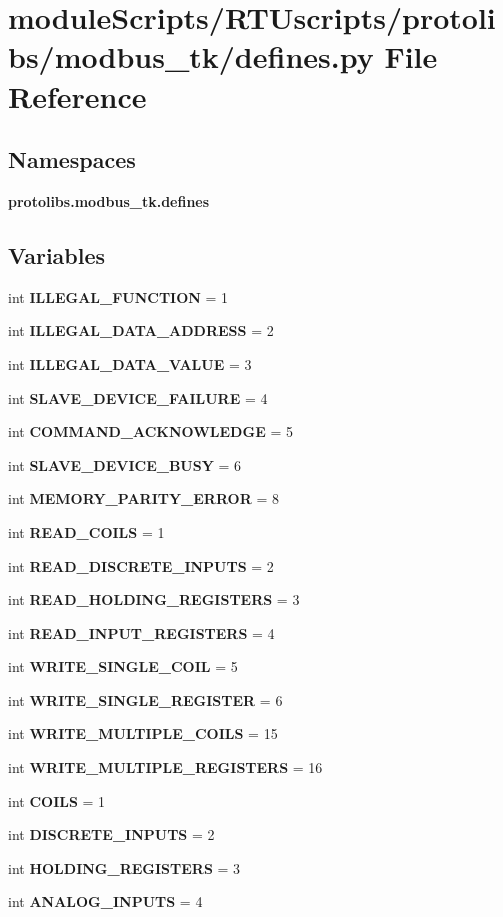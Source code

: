 \section{module\+Scripts/\+R\+T\+Uscripts/protolibs/modbus\+\_\+tk/defines.py File Reference}
\label{modbus__tk_2defines_8py}
\subsection*{Namespaces}
\begin{DoxyCompactItemize}
\item 
 {\bf protolibs.\+modbus\+\_\+tk.\+defines}
\end{DoxyCompactItemize}
\subsection*{Variables}
\begin{DoxyCompactItemize}
\item 
int {\bf I\+L\+L\+E\+G\+A\+L\+\_\+\+F\+U\+N\+C\+T\+I\+O\+N} = 1
\item 
int {\bf I\+L\+L\+E\+G\+A\+L\+\_\+\+D\+A\+T\+A\+\_\+\+A\+D\+D\+R\+E\+S\+S} = 2
\item 
int {\bf I\+L\+L\+E\+G\+A\+L\+\_\+\+D\+A\+T\+A\+\_\+\+V\+A\+L\+U\+E} = 3
\item 
int {\bf S\+L\+A\+V\+E\+\_\+\+D\+E\+V\+I\+C\+E\+\_\+\+F\+A\+I\+L\+U\+R\+E} = 4
\item 
int {\bf C\+O\+M\+M\+A\+N\+D\+\_\+\+A\+C\+K\+N\+O\+W\+L\+E\+D\+G\+E} = 5
\item 
int {\bf S\+L\+A\+V\+E\+\_\+\+D\+E\+V\+I\+C\+E\+\_\+\+B\+U\+S\+Y} = 6
\item 
int {\bf M\+E\+M\+O\+R\+Y\+\_\+\+P\+A\+R\+I\+T\+Y\+\_\+\+E\+R\+R\+O\+R} = 8
\item 
int {\bf R\+E\+A\+D\+\_\+\+C\+O\+I\+L\+S} = 1
\item 
int {\bf R\+E\+A\+D\+\_\+\+D\+I\+S\+C\+R\+E\+T\+E\+\_\+\+I\+N\+P\+U\+T\+S} = 2
\item 
int {\bf R\+E\+A\+D\+\_\+\+H\+O\+L\+D\+I\+N\+G\+\_\+\+R\+E\+G\+I\+S\+T\+E\+R\+S} = 3
\item 
int {\bf R\+E\+A\+D\+\_\+\+I\+N\+P\+U\+T\+\_\+\+R\+E\+G\+I\+S\+T\+E\+R\+S} = 4
\item 
int {\bf W\+R\+I\+T\+E\+\_\+\+S\+I\+N\+G\+L\+E\+\_\+\+C\+O\+I\+L} = 5
\item 
int {\bf W\+R\+I\+T\+E\+\_\+\+S\+I\+N\+G\+L\+E\+\_\+\+R\+E\+G\+I\+S\+T\+E\+R} = 6
\item 
int {\bf W\+R\+I\+T\+E\+\_\+\+M\+U\+L\+T\+I\+P\+L\+E\+\_\+\+C\+O\+I\+L\+S} = 15
\item 
int {\bf W\+R\+I\+T\+E\+\_\+\+M\+U\+L\+T\+I\+P\+L\+E\+\_\+\+R\+E\+G\+I\+S\+T\+E\+R\+S} = 16
\item 
int {\bf C\+O\+I\+L\+S} = 1
\item 
int {\bf D\+I\+S\+C\+R\+E\+T\+E\+\_\+\+I\+N\+P\+U\+T\+S} = 2
\item 
int {\bf H\+O\+L\+D\+I\+N\+G\+\_\+\+R\+E\+G\+I\+S\+T\+E\+R\+S} = 3
\item 
int {\bf A\+N\+A\+L\+O\+G\+\_\+\+I\+N\+P\+U\+T\+S} = 4
\end{DoxyCompactItemize}
